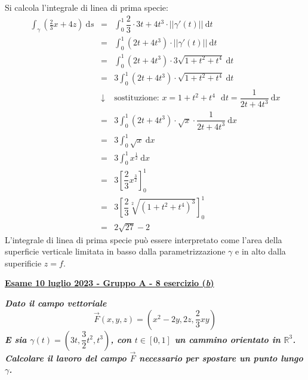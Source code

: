\documentclass[a4paper]{article}
\newcommand{\definition}[1]{\textcolor{Red3}{\textbf{#1}}}
\newcommand{\example}[1]{\textcolor{Green4}{\textbf{#1}}}
\begin{document}
	\noindent
	Si calcola l'integrale di linea di prima specie:
	\begin{equation*}
		\begin{array}{rcl}
			\displaystyle\int_{\gamma}\left(\frac{2}{3}x+4z\right)\:\mathrm{d}s
			&=&
			\displaystyle\int_{0}^{1} \dfrac{2}{3} \cdot 3t + 4t^{3} \cdot \left|\left|\gamma'\left(t\right) \right|\right| \:\mathrm{d}t \\ [1.5em]
			&=&
			\displaystyle\int_{0}^{1} \left(2t + 4t^{3}\right) \cdot \left|\left|\gamma'\left(t\right) \right|\right| \:\mathrm{d}t \\ [1.5em]
			&=&
			\displaystyle\int_{0}^{1} \left(2t + 4t^{3}\right) \cdot 3\sqrt{1+t^{2}+t^{4}} \:\mathrm{d}t \\ [1.5em]
			&=&
			3\displaystyle\int_{0}^{1} \left(2t + 4t^{3}\right) \cdot \sqrt{1+t^{2}+t^{4}} \:\mathrm{d}t \\ [1.5em]
			&\downarrow&
			\text{sostituzione: }x = 1+t^{2}+t^{4} \:\:\: \mathrm{d}t = \dfrac{1}{2t+4t^{3}}\:\mathrm{d}x \\ [1.5em]
			&=&
			3\displaystyle\int_{0}^{1} \left(2t + 4t^{3}\right) \cdot \sqrt{x} \cdot \dfrac{1}{2t + 4t^{3}} \:\mathrm{d}x \\ [1.5em]
			&=&
			3\displaystyle\int_{0}^{1} \sqrt{x} \:\mathrm{d}x \\ [1.5em]
			&=&
			3\displaystyle\int_{0}^{1} x^{\frac{1}{2}} \:\mathrm{d}x \\ [1.5em]
			&=&
			3\left[\dfrac{2}{3}x^{\frac{3}{2}}\right]_{0}^{1} \\ [1.5em]
			&=&
			3\left[\dfrac{2}{3}\sqrt[2]{\left(1+t^{2}+t^{4}\right)^{3}}\right]_{0}^{1} \\ [1.5em]
			&=&
			2\sqrt{27} - 2
		\end{array}
	\end{equation*}
	L'integrale di linea di prima specie può essere interpretato come l'area della superficie verticale limitata in basso dalla parametrizzazione $\gamma$ e in alto dalla superificie $z = f$.

	\newpage

	\begin{flushleft}
		\label{exam: esame 10 luglio 2023 - Gruppo A - 8 esercizio (b)}
		\hypertarget{
			exam: esame 10 luglio 2023 - Gruppo A - 8 esercizio (b)
		}{
			\definition{\underline{Esame 10 luglio 2023 - Gruppo A - 8 esercizio (\emph{b})}}
		}
	\end{flushleft}
	\example{\emph{Dato il campo vettoriale}
	\begin{equation*}
		\overset{\rightarrow}{F}\left(x,y,z\right) = \left(x^{2} - 2y, 2z, \dfrac{2}{3}xy\right)
	\end{equation*}
	\emph{E sia $\gamma\left(t\right) = \left(3t, \dfrac{3}{2}t^{2}, t^{3}\right)$, con $t \in \left[0,1\right]$ un cammino orientato in $\mathbb{R}^{3}$. Calcolare il lavoro del campo $\overset{\rightarrow}{F}$ necessario per spostare un punto lungo $\gamma$.}}\newline
\end{document}
